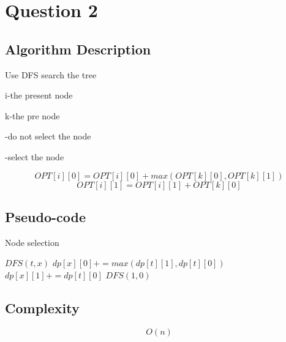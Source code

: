 \section{Question 2}
\subsection{Algorithm Description}
Use DFS search the tree\par
i-the present node\par
k-the pre node\par
[0]-do not select the node\par
[1]-select the node\par
$$OPT[i][0]=OPT[i][0]+max(OPT[k][0],OPT[k][1])$$
$$OPT[i][1]=OPT[i][1]+OPT[k][0]$$
\subsection{Pseudo-code}

\begin{breakablealgorithm}
	\caption{Node selection}
	\begin{algorithmic}[1] %
		\State $DFS(t,x)$
		\State $dp[x][0]+=max(dp[t][1],dp[t][0])$
		\State $dp[x][1]+=dp[t][0]$
		\EndFor
		\State {}
		\EndFunction
		\State $DFS(1,0)$
		\State {}
		\EndFunction
	\end{algorithmic}
\end{breakablealgorithm}

\subsection{Complexity}
$$O(n)$$